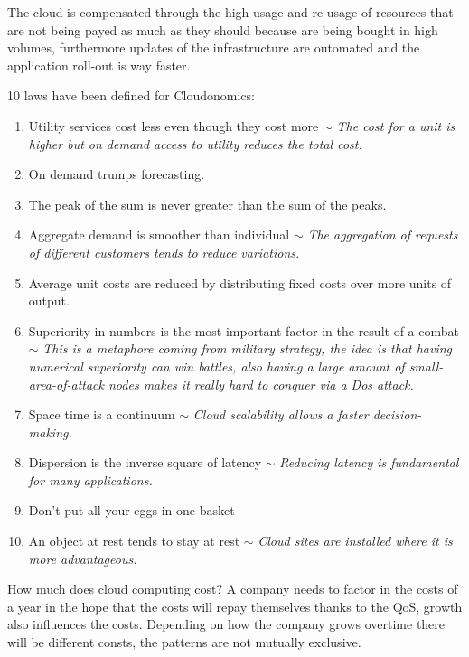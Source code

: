 The cloud is compensated through the high usage and re-usage of resources that are not being payed
as much as they should because are being bought in high volumes, furthermore updates of the
infrastructure are outomated and the application roll-out is way faster.

10 laws have been defined for Cloudonomics:
\begin{enumerate}
    \item Utility services cost less even though they cost more $\sim$ \textit{The cost for a unit is higher but on demand access to utility reduces the total cost.}
    \item On demand trumps forecasting.
    \item The peak of the sum is never greater than the sum of the peaks.
    \item Aggregate demand is smoother than individual $\sim$ \textit{The aggregation of requests of different customers tends to reduce variations.}
    \item Average unit costs are reduced by distributing fixed costs over more units of output.
    \item Superiority in numbers is the most important factor in the result of a combat $\sim$ \textit{This is a metaphore coming from military strategy, the idea is that having numerical superiority can win battles, also having a large amount of small-area-of-attack nodes makes it really hard to conquer via a Dos attack.}
    \item Space time is a continuum $\sim$ \textit{Cloud scalability allows a faster decision-making.}
    \item Dispersion is the inverse square of latency $\sim$ \textit{Reducing latency is fundamental for many applications.}
    \item Don't put all your eggs in one basket
    \item An object at rest tends to stay at rest $\sim$ \textit{Cloud sites are installed where it is more advantageous.}
\end{enumerate}
How much does cloud computing cost? A company needs to factor in the costs of a year in the hope that the costs will repay themselves thanks to the QoS, growth also influences the costs. Depending on how the company grows overtime there will be different consts, the patterns are not mutually exclusive.

